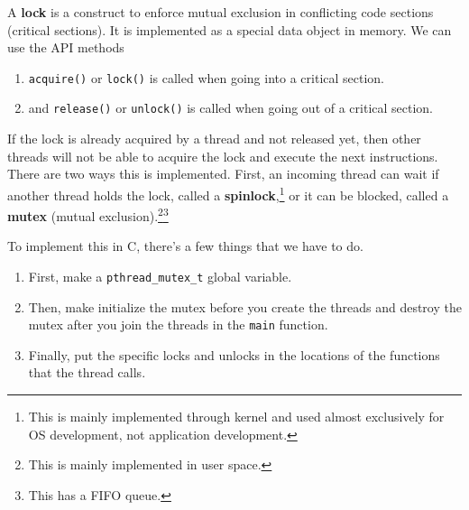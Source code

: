 \documentclass{article}
\begin{document}
    \begin{definition}[Lock]
      A \textbf{lock} is a construct to enforce mutual exclusion in conflicting code sections (critical sections). It is implemented as a special data object in memory. We can use the API methods
      \begin{enumerate}
        \item \texttt{acquire()} or \texttt{lock()} is called when going into a critical section. 
        \item and \texttt{release()} or \texttt{unlock()} is called when going out of a critical section. 
      \end{enumerate}
      If the lock is already acquired by a thread and not released yet, then other threads will not be able to acquire the lock and execute the next instructions. There are two ways this is implemented. First, an incoming thread can wait if another thread holds the lock, called a \textbf{spinlock},\footnote{This is mainly implemented through kernel and used almost exclusively for OS development, not application development.} or it can be blocked, called a \textbf{mutex} (mutual exclusion).\footnote{This is mainly implemented in user space. }\footnote{This has a FIFO queue. }
    \end{definition}

    To implement this in C, there's a few things that we have to do. 
    \begin{enumerate}
      \item First, make a \texttt{pthread\_mutex\_t} global variable. 
      \item Then, make initialize the mutex before you create the threads and destroy the mutex after you join the threads in the \texttt{main} function. 
      \item Finally, put the specific locks and unlocks in the locations of the functions that the thread calls. 
    \end{enumerate}
\end{document}

